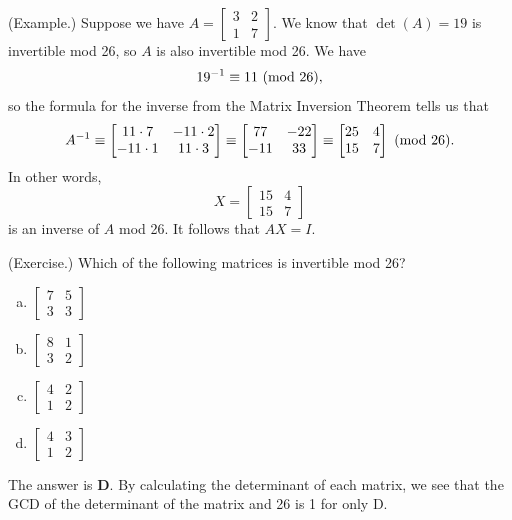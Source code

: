 \documentclass[letterpaper]{article}
\begin{document}
\begin{mdframed}
    (Example.) Suppose we have $A = \begin{bmatrix}
        3 & 2 \\ 1 & 7
    \end{bmatrix}$. We know that $\det(A) = 19$ is invertible mod 26, so $A$ is also invertible mod 26. We have \[19^{-1} \equiv 11 \ (\mathrm{mod}\ 26),\] so the formula for the inverse from the Matrix Inversion Theorem tells us that \[A^{-1} \equiv \begin{bmatrix}
        11 \cdot 7 & -11 \cdot 2 \\ -11 \cdot 1 & 11 \cdot 3 
    \end{bmatrix} \equiv \begin{bmatrix}
        77 & -22 \\ -11 & 33
    \end{bmatrix} \equiv \begin{bmatrix}
        25 & 4 \\ 15 & 7
    \end{bmatrix} \ (\mathrm{mod}\ 26).\] In other words, \[X = \begin{bmatrix}
        15 & 4 \\ 15 & 7
    \end{bmatrix}\] is an inverse of $A$ mod 26. It follows that $AX = I$. 
\end{mdframed}

\begin{mdframed}
    (Exercise.) Which of the following matrices is invertible mod 26? 
    \begin{enumerate}[(a)]
        \item $\begin{bmatrix}
            7 & 5 \\ 3 & 3 
        \end{bmatrix}$
        \item $\begin{bmatrix}
            8 & 1 \\ 3 & 2 
        \end{bmatrix}$
        \item $\begin{bmatrix}
            4 & 2 \\ 1 & 2 
        \end{bmatrix}$
        \item $\begin{bmatrix}
            4 & 3 \\ 1 & 2
        \end{bmatrix}$
    \end{enumerate}

    \begin{mdframed}
        The answer is \textbf{D}. By calculating the determinant of each matrix, we see that the GCD of the determinant of the matrix and 26 is 1 for only D. 
    \end{mdframed}
\end{mdframed}
\end{document}
